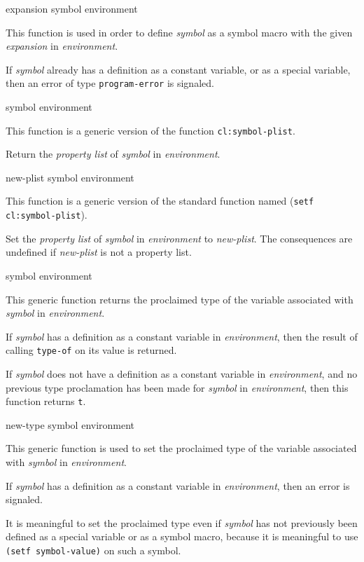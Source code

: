  {expansion symbol environment}

This function is used in order to define \textit{symbol} as a symbol
macro with the given \textit{expansion} in \textit{environment}.

If \textit{symbol} already has a definition as a constant variable, or
as a special variable, then an error of type \texttt{program-error} is
signaled.

 {symbol environment}

This function is a generic version of the \commonlisp{} function
\texttt{cl:symbol-plist}.

Return the \emph{property list} of \textit{symbol} in
\textit{environment}.

 {new-plist symbol environment}

This function is a generic version of the standard \commonlisp{}
function named (\texttt{setf cl:symbol-plist}).

Set the \emph{property list} of \textit{symbol} in
\textit{environment} to \textit{new-plist}.  The consequences are
undefined if \textit{new-plist} is not a property list.

 {symbol environment}

This generic function returns the proclaimed type of the variable
associated with \textit{symbol} in \textit{environment}.

If \textit{symbol} has a definition as a constant variable in
\textit{environment}, then the result of calling \texttt{type-of} on
its value is returned.

If \textit{symbol} does not have a definition as a constant variable
in \textit{environment}, and no previous type proclamation has been
made for \textit{symbol} in \textit{environment}, then this function
returns \texttt{t}.

 {new-type symbol environment}

This generic function is used to set the proclaimed type of the
variable associated with \textit{symbol} in \textit{environment}.

If \textit{symbol} has a definition as a constant variable in
\textit{environment}, then an error is signaled.

It is meaningful to set the proclaimed type even if \textit{symbol}
has not previously been defined as a special variable or as a symbol
macro, because it is meaningful to use \texttt{(setf symbol-value)} on
such a symbol.

